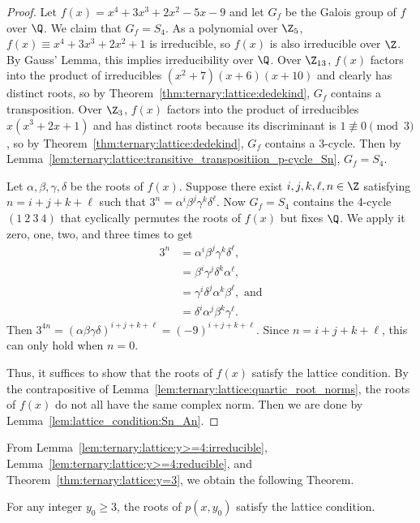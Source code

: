 \documentclass[11pt]{article}
\begin{document}
\begin{proof}
 Let $f(x) = x^4 + 3 x^3 + 2 x^2 - 5 x - 9$ and let $G_f$ be the Galois group of $f$ over $\Q$.
 We claim that $G_f = S_4$.
 As a polynomial over $\Z_5$,
 $f(x) \equiv x^4 + 3 x^3 + 2 x^2 + 1$ is irreducible,
 so $f(x)$ is also irreducible over $\Z$.
 By Gauss' Lemma,
 this implies irreducibility over $\Q$.
 Over $\Z_{13}$,
 $f(x)$ factors into the product of irreducibles $(x^2 + 7) (x + 6) (x + 10)$ and clearly has distinct roots,
 so by Theorem~\ref{thm:ternary:lattice:dedekind},
 $G_f$ contains a transposition.
 Over $\Z_3$,
 $f(x)$ factors into the product of irreducibles $x (x^3 + 2 x + 1)$ and has distinct roots because its discriminant is $1 \not\equiv 0 \pmod{3}$,
 so by Theorem~\ref{thm:ternary:lattice:dedekind},
 $G_f$ contains a 3-cycle.
 Then by Lemma~\ref{lem:ternary:lattice:transitive_transpositiion_p-cycle_Sn},
 $G_f = S_4$.
 
 Let $\alpha, \beta, \gamma, \delta$ be the roots of $f(x)$.
 Suppose there exist $i,j,k,\ell,n \in \Z$ satisfying $n = i + j + k + \ell$ such that $3^n = \alpha^i \beta^j \gamma^k \delta^\ell$.
 Now $G_f = S_4$ contains the 4-cycle $(1\ 2\ 3\ 4)$ that cyclically permutes the roots of $f(x)$ but fixes $\Q$.
 We apply it zero, one, two, and three times to get
 \begin{align*}
  3^n
  &= \alpha^i \beta^j  \gamma^k \delta^\ell, \\
  &= \beta^i  \gamma^j \delta^k \alpha^\ell, \\
  &= \gamma^i \delta^j \alpha^k \beta^\ell, \text{ and}  \\
  &= \delta^i \alpha^j \beta^k  \gamma^\ell.
 \end{align*}
 Then $3^{4n} = (\alpha \beta \gamma \delta)^{i+j+k+\ell} = (-9)^{i+j+k+\ell}$.
 Since $n = i+j+k+\ell$,
 this can only hold when $n = 0$.
 
 Thus, it suffices to show that the roots of $f(x)$ satisfy the lattice condition.
 By the contrapositive of Lemma~\ref{lem:ternary:lattice:quartic_root_norms},
 the roots of $f(x)$ do not all have the same complex norm.
 Then we are done by Lemma~\ref{lem:lattice_condition:Sn_An}.
\end{proof}

From Lemma~\ref{lem:ternary:lattice:y>=4:irreducible},
Lemma~\ref{lem:ternary:lattice:y>=4:reducible},
and Theorem~\ref{thm:ternary:lattice:y=3},
we obtain the following Theorem.

\begin{theorem} \label{thm:ternary:lattice}
 For any integer $y_0 \ge 3$,
 the roots of $p(x,y_0)$ satisfy the lattice condition.
\end{theorem}
\end{document}
